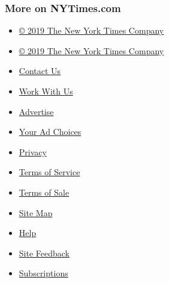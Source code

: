 \hypertarget{more-on-nytimescom}{%
\subsubsection{More on NYTimes.com}\label{more-on-nytimescom}}

\begin{itemize}
\tightlist
\item
  \href{http://www.nytco.com}{© 2019 The New York Times Company}
\end{itemize}

\begin{itemize}
\tightlist
\item
  \href{http://www.nytco.com}{© 2019 The New York Times Company}
\item
  \href{http://www.nytimes3xbfgragh.onion/ref/membercenter/help/infoservdirectory.html}{Contact
  Us}
\item
  \href{http://www.nytco.com/careers}{Work With Us}
\item
  \href{http://www.nytimes.whsites.net/mediakit}{Advertise}
\item
  \href{http://www.nytimes3xbfgragh.onion/content/help/rights/privacy/policy/privacy-policy.html\#pp}{Your
  Ad Choices}
\item
  \href{http://www.nytimes3xbfgragh.onion/privacy}{Privacy}
\item
  \href{http://www.nytimes3xbfgragh.onion/ref/membercenter/help/agree.html}{Terms
  of Service}
\item
  \href{http://www.nytimes3xbfgragh.onion/content/help/rights/sale/terms-of-sale.html}{Terms
  of Sale}
\end{itemize}

\begin{itemize}
\tightlist
\item
  \href{http://spiderbites.nytimes3xbfgragh.onion}{Site Map}
\item
  \href{http://www.nytimes3xbfgragh.onion/membercenter/sitehelp.html}{Help}
\item
  \href{https://myaccount.nytimes3xbfgragh.onion/membercenter/feedback.html}{Site
  Feedback}
\item
  \href{http://www.nytimes3xbfgragh.onion/subscriptions/Multiproduct/lp5558.html?campaignId=37WXW}{Subscriptions}
\end{itemize}
